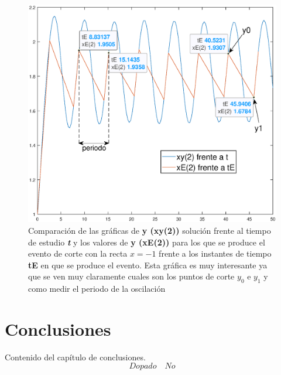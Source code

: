\documentclass[12pt,a4paper]{report} %
\begin{document}
	\begin{figure}[h]
		\centering
		\includegraphics[width=1\textwidth]{g3ejem6.eps}
		\caption{Comparación de las gráficas de \textbf{y (xy(2))} solución frente al tiempo de estudio \textit{\textbf{t}} y los valores de \textbf{y (xE(2))} para los que se produce el evento de corte con la recta $x=-1$ frente a los instantes de tiempo \textbf{tE} en que se produce el evento. Esta gráfica es muy interesante ya que se ven muy claramente cuales son los puntos de corte $y_0$ e $y_1$ y como medir el periodo de la oscilación}
		\label{fig:g3ejem6}
	\end{figure}\smallskip
	
	\chapter*{Conclusiones}
	Contenido del capítulo de conclusiones.
	\vspace{5cm}
	\begin{equation}
		Dopado \quad No 
	\end{equation}
	
	\newpage
	
\end{document}
